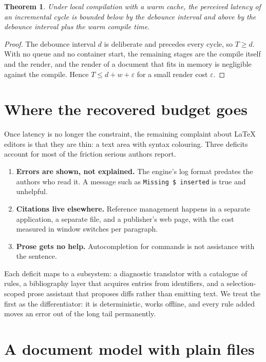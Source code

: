 \documentclass[11pt,a4paper]{article}
\newtheorem{theorem}{Theorem}
\theoremstyle{definition}
\begin{document}
\begin{theorem}
  Under local compilation with a warm cache, the perceived latency of an incremental cycle is
  bounded below by the debounce interval and above by the debounce interval plus the warm
  compile time.
\end{theorem}

\begin{proof}
  The debounce interval $d$ is deliberate and precedes every cycle, so $T \geq d$. With no queue
  and no container start, the remaining stages are the compile itself and the render, and the
  render of a document that fits in memory is negligible against the compile. Hence
  $T \leq d + w + \varepsilon$ for a small render cost $\varepsilon$.
\end{proof}

\section{Where the recovered budget goes}
\label{sec:editor}

Once latency is no longer the constraint, the remaining complaint about \LaTeX{} editors is that
they are thin: a text area with syntax colouring. Three deficits account for most of the
friction serious authors report.

\begin{enumerate}
  \item \textbf{Errors are shown, not explained.} The engine's log format predates the authors
    who read it. A message such as \texttt{Missing \$ inserted} is true and unhelpful.
  \item \textbf{Citations live elsewhere.} Reference management happens in a separate
    application, a separate file, and a publisher's web page, with the cost measured in
    window switches per paragraph.
  \item \textbf{Prose gets no help.} Autocompletion for commands is not assistance with the
    sentence.
\end{enumerate}

Each deficit maps to a subsystem: a diagnostic translator with a catalogue of rules, a
bibliography layer that acquires entries from identifiers, and a selection-scoped prose
assistant that proposes diffs rather than emitting text. We treat the first as the
differentiator: it is deterministic, works offline, and every rule added moves an error out of
the long tail permanently.

\section{A document model with plain files}
\label{sec:model}
\end{document}
